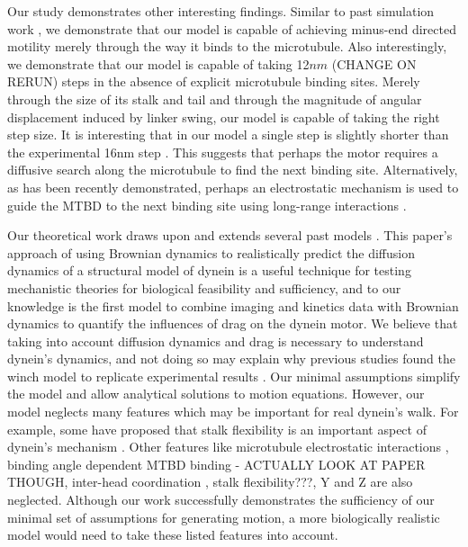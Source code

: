 \documentclass[9pt,twocolumn,twoside]{article}
\begin{document}
Our study demonstrates other interesting findings. Similar to past simulation work \cite{sarlahmodel}, we demonstrate that our model is capable of achieving minus-end directed motility merely through the way it binds to the microtubule. Also interestingly, we demonstrate that our model is capable of taking 12$nm$ (CHANGE ON RERUN) steps in the absence of explicit microtubule binding sites. Merely through the size of its stalk and tail and through the magnitude of angular displacement induced by linker swing, our model is capable of taking the right step size. It is interesting that in our model a single step is slightly shorter than the experimental 16nm step \cite{find-citation}. This suggests that perhaps the motor requires a diffusive search along the microtubule to find the next binding site. Alternatively, as has been recently demonstrated, perhaps an electrostatic mechanism is used to guide the MTBD to the next binding site using long-range interactions \cite{longrangemt}.

Our theoretical work draws upon and extends several past models \cite{sarlahmodel, trottmodel, tsygankovemsimulation, zhaomodel}. This paper's approach of using Brownian dynamics to realistically predict the diffusion dynamics of a structural model of dynein is a useful technique for testing mechanistic theories for biological feasibility and sufficiency, and to our knowledge is the first model to combine imaging and kinetics data with Brownian dynamics to quantify the influences of drag on the dynein motor. We believe that taking into account diffusion dynamics and drag is necessary to understand dynein's dynamics, and not doing so may explain why previous studies found the winch model to replicate experimental results \cite{sarlahmodel}. Our minimal assumptions simplify the model and allow analytical solutions to motion equations. However, our model neglects many features which may be important for real dynein's walk. For example, some have proposed that stalk flexibility is an important aspect of dynein's mechanism \cite{mdstalk, lippert, find-that-other-possibly-burgess-paper}. Other features like microtubule electrostatic interactions \cite{longrangemt}, binding angle dependent MTBD binding \cite{responsetoload} - ACTUALLY LOOK AT PAPER THOUGH, inter-head coordination \cite{tsygankovscheme, tsygankovemsimulation}, stalk flexibility???, Y and Z are also neglected. Although our work successfully demonstrates the sufficiency of our minimal set of assumptions for generating motion, a more biologically realistic model would need to take these listed features into account.
\end{document}
